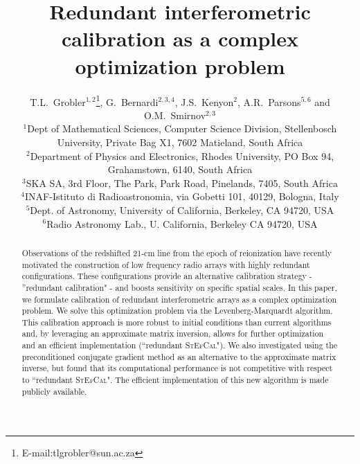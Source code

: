 \documentclass[useAMS,usenatbib]{mn2e}
\title[Redundant calibration and Complex Optimization]{Redundant interferometric calibration as a complex optimization problem}
\author[T.L.~Grobler et al.]{T.L.~Grobler$^{1,2}$\thanks{E-mail:tlgrobler@sun.ac.za}, G.~Bernardi$^{2,3,4}$, J.S.~Kenyon$^{2}$, A.R.~Parsons$^{5,6}$ and O.M.~Smirnov$^{2,3}$\\
$^{1}$Dept of Mathematical Sciences, Computer Science Division, Stellenbosch University, Private Bag X1, 7602 Matieland, South Africa\\
$^{2}$Department of Physics and Electronics, Rhodes University, PO Box 94, Grahamstown, 6140, South Africa\\
$^{3}$SKA SA, 3rd Floor, The Park, Park Road, Pinelands, 7405, South Africa\\
$^{4}$INAF-Istituto di Radioastronomia, via Gobetti 101, 40129, Bologna, Italy\\
$^{5}$Dept. of Astronomy, University of California, Berkeley, CA 94720, USA\\
$^{6}$Radio Astronomy Lab., U. California, Berkeley CA 94720, USA}
\begin{document}

\pagerange{\pageref{firstpage}--\pageref{lastpage}} 

\maketitle

\label{firstpage}

\begin{abstract}
Observations of the redshifted 21-cm line from the epoch of reionization have recently motivated the construction of low 
frequency radio arrays with highly redundant configurations. These configurations provide an alternative calibration strategy - 
''redundant calibration" - and boosts sensitivity on specific spatial scales. In this paper, we formulate 
calibration of redundant interferometric arrays as a complex optimization problem. 
We solve this optimization problem via the Levenberg-Marquardt algorithm. This calibration approach is more 
robust to initial conditions than current algorithms and, by leveraging an approximate matrix inversion, allows for further optimization and an efficient implementation (``redundant \textsc{StEfCal}"). We also investigated using the preconditioned conjugate gradient method as an alternative to the approximate matrix inverse, but found that its computational performance is not competitive with respect to ``redundant \textsc{StEfCal}". The efficient implementation of this new algorithm is made publicly available.

\end{abstract}
\end{document}
